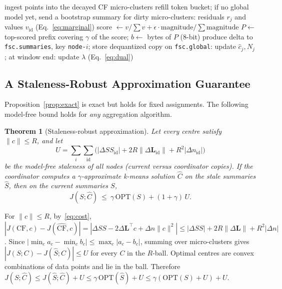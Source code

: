 \documentclass[journal]{IEEEtran}
\newtheorem{theorem}{Theorem}
\newcommand{\LS}{\mathbf{L}}
\newcommand{\cf}{\mathrm{CF}}
\begin{document}
\begin{algorithm}[t]
\caption{FedCAST edge node $i$ (one tick)}\label{alg:edge}
\small
\begin{algorithmic}[1]
\State ingest points into the decayed CF micro-clusters
\State refill token bucket; if no global model yet, send a bootstrap summary
\State for dirty micro-clusters: residuals $r_j$ and values $v_{\mathrm{id}}$ (Eq.~\ref{eq:marginal})
\State score $\gets v/\sum v+\epsilon\cdot\text{magnitude}/\sum\text{magnitude}$
\State $P\gets$ top-scored prefix covering $\gamma$ of the score; $b\gets$ bytes of $P$ (8-bit)
  \State produce delta to \texttt{fsc.summaries}, key \texttt{node-}$i$; store dequantized copy
\EndIf
\State on \texttt{fsc.global}: update $\hat c_j,N_j$; at window end: update $\lambda$ (Eq.~\ref{eq:dual})
\end{algorithmic}
\end{algorithm}

\subsection{A Staleness-Robust Approximation Guarantee}
Proposition~\ref{prop:exact} is exact but holds for fixed assignments. The following model-free bound holds for \emph{any} aggregation algorithm.

\begin{theorem}[Staleness-robust approximation]\label{thm:robust}
Let every centre satisfy $\|c\|\le R$, and let
\[
U=\sum_i\sum_{\mathrm{id}}\big(|\Delta SS_{\mathrm{id}}|+2R\|\Delta\LS_{\mathrm{id}}\|+R^2|\Delta n_{\mathrm{id}}|\big)
\]
be the model-free staleness of all nodes (current versus coordinator copies). If the coordinator computes a $\gamma$-approximate k-means solution $\hat C$ on the stale summaries $\hat S$, then on the current summaries $S$,
\begin{equation}
J(S;\hat C)\ \le\ \gamma\,\mathrm{OPT}(S)+(1+\gamma)\,U .
\end{equation}
\end{theorem}
\begin{IEEEproof}
For $\|c\|\le R$, by~\eqref{eq:cost}, $|J(\cf,c)-J(\widehat{\cf},c)|=|\Delta SS-2\Delta\LS^{\!\top}c+\Delta n\|c\|^2|\le|\Delta SS|+2R\|\Delta\LS\|+R^2|\Delta n|$. Since $|\min_c a_c-\min_c b_c|\le\max_c|a_c-b_c|$, summing over micro-clusters gives $|J(S;C)-J(\hat S;C)|\le U$ for every $C$ in the $R$-ball. Optimal centres are convex combinations of data points and lie in the ball. Therefore $J(S;\hat C)\le J(\hat S;\hat C)+U\le\gamma\,\mathrm{OPT}(\hat S)+U\le\gamma(\mathrm{OPT}(S)+U)+U$.
\end{IEEEproof}
\end{document}
